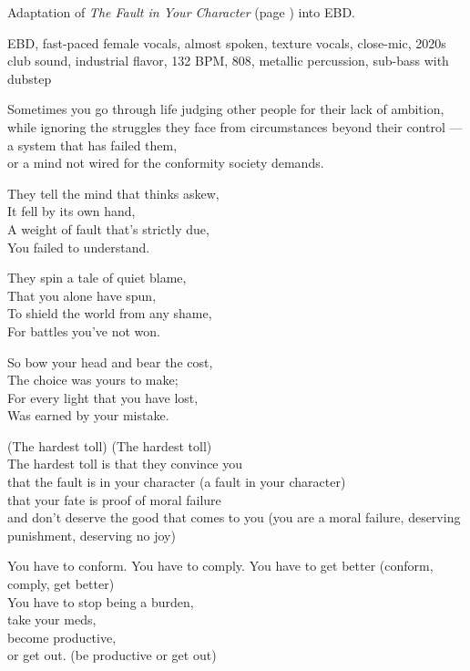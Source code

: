 
\begin{notes}
Adaptation of \emph{The Fault in Your Character} (page \pageref{sec:fault-in-your-character}) into EBD.
\end{notes}
\begin{style}
EBD, fast-paced female vocals, almost spoken, texture vocals, close-mic, 2020s club sound, industrial flavor, 132 BPM, 808, metallic percussion, sub-bass with dubstep
\end{style}
\begin{lyrics}
Sometimes you go through life judging other people for their lack of ambition,\\
while ignoring the struggles they face from circumstances beyond their control
—a system that has failed them,\\
or a mind not wired for the conformity society demands.

They tell the mind that thinks askew,\\
It fell by its own hand,\\
A weight of fault that's strictly due,\\
You failed to understand.

They spin a tale of quiet blame,\\
That you alone have spun,\\
To shield the world from any shame,\\
For battles you've not won.

So bow your head and bear the cost,\\
The choice was yours to make;\\
For every light that you have lost,\\
Was earned by your mistake.

(The hardest toll)
(The hardest toll)\\
The hardest toll is that they convince you\\
that the fault is in your character
(a fault in your character)\\
that your fate is proof of moral failure\\
and don't deserve the good that comes to you
(you are a moral failure, deserving punishment, deserving no joy)

You have to conform. You have to comply. You have to get better
(conform, comply, get better)\\
You have to stop being a burden,\\
take your meds,\\
become productive,\\
or get out.
(be productive or get out)


\end{lyrics}
